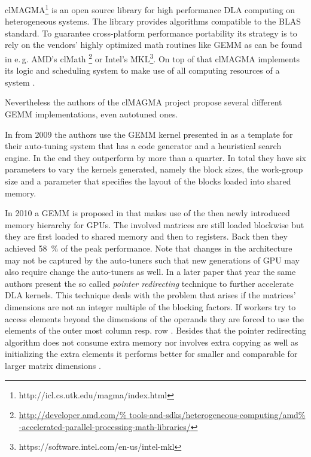 clMAGMA\footnote{http://icl.cs.utk.edu/magma/index.html} is an open source 
library for high performance \ac{DLA} computing on heterogeneous systems. The 
library provides algorithms compatible to the \ac{BLAS} standard. To guarantee 
cross-platform performance portability its strategy is to rely on the vendors' 
highly optimized math routines like \ac{GEMM} as can be found in e.\,g. 
AMD's clMath \footnote{\url{http://developer.amd.com/%
tools-and-sdks/heterogeneous-computing/amd%
-accelerated-parallel-processing-math-libraries/}} or Intel's 
\ac{MKL}\footnote{https://software.intel.com/en-us/intel-mkl}. On top of that 
clMAGMA implements its logic and scheduling system to make use of all computing 
resources of a system \cite{Dongarra2013}.

Nevertheless the authors of the clMAGMA project propose several 
different \ac{GEMM} implementations, even autotuned ones.

In \cite{Li2009} from 2009 the authors use the \ac{GEMM} kernel presented in 
\cite{Volkov2008} as a template for their auto-tuning system that has a code 
generator and a heuristical search engine. In the end they outperform 
\cite{Volkov2008} by more than a quarter. In total they have six parameters to 
vary the kernels generated, namely the block sizes, the work-group size and a 
parameter that specifies the layout of the blocks loaded into shared memory.

In 2010 a \ac{GEMM} is proposed in \cite{Nath2010} that makes use of the then 
newly introduced memory hierarchy for \acp{GPU}. The involved matrices are 
still loaded blockwise but they are first loaded to shared memory and then to 
registers. Back then they achieved \SI{58}{\percent} of the peak performance.
Note that changes in the architecture may not be captured by the auto-tuners 
such that new generations of \ac{GPU} may also require change the auto-tuners 
as well.
In a later paper that year the same authors present the so called 
\textit{pointer redirecting} technique to further accelerate \ac{DLA} kernels. 
This technique deals with the problem that arises if the matrices' dimensions 
are not an integer multiple of the blocking factors. If workers try to access 
elements beyond the dimensions of the operands they are forced to use the 
elements of the outer most column resp. row \cite[Section 3]{Nath2010a}. 
Besides that the pointer redirecting algorithm does not consume extra memory 
nor involves extra copying as well as initializing the extra elements it 
performs better for smaller and comparable for larger matrix dimensions 
\cite[Section 5]{Nath2010a}.

